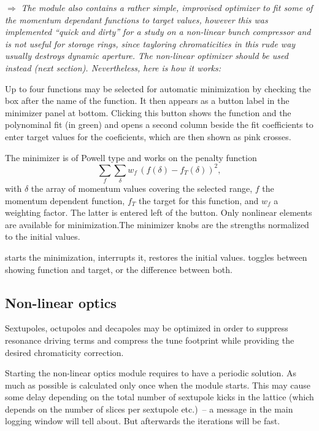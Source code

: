 \documentclass[12pt]{article}
\newcommand\todo[1]{$\Longrightarrow$ {\em #1} }
\newcommand\button[1]{\fbox{\small\bf #1}}
\begin{document}
\todo{The module also contains a rather simple, improvised optimizer to fit some of the momentum dependant functions to target values, however this was implemented ``quick and dirty'' for a study on a non-linear bunch compressor and is not useful for storage rings, since tayloring chromaticities in this rude way usually destroys dynamic aperture. The non-linear optimizer should be used instead (next section). Nevertheless, here is how it works:}

Up to four functions may be selected for automatic minimization by checking the box after the name of the function. It then appears as a button label in the minimizer panel at bottom.
Clicking this button shows the function and the polynominal fit (in green) and opens a second column beside the fit coefficients to enter target values for the coeficients, which are then shown as pink crosses.

The minimizer is of Powell type and works on the penalty function
\[
\sum_f \sum_{\delta} w_f \, (f(\delta)-f_T (\delta))^2,
\]
with $\delta$ the array of momentum values covering the selected range, $f$ the momentum dependent function, $f_T$ the target for this function, and $w_f$ a weighting factor. The latter is entered left of the button. 
Only nonlinear elements are available for minimization.The minimizer knobs are the strengths normalized to the initial values. 

\button{Optimize} starts the minimization, \button{Break} interrupts it, \button{Reset} restores the initial values. \button{Plot absolute/relative} toggles between showing function and target, or the difference between both.


\subsection{\label{ssecnld}Non-linear optics}

Sextupoles, octupoles and decapoles may be optimized in order to suppress resonance driving terms and compress the tune footprint while providing the desired chromaticity correction.

Starting the non-linear optics module requires to have a periodic solution.
As much as possible is calculated only once when the module starts.
This may cause some delay depending on the total number of sextupole kicks
in the lattice (which depends on the number of slices per sextupole etc.)~-- a message in the main logging window will tell about. But afterwards the iterations will be fast.
\end{document}
